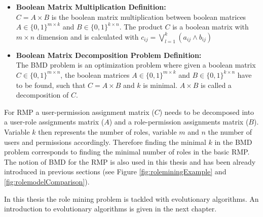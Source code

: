     \begin{itemize}
	    \item \textbf{Boolean Matrix Multiplication Definition:}\\
	    $C = A \times B$ is the boolean matrix multiplication between boolean matrices $A \in \{0,1\}^{m \times k}$ and $B \in \{0,1\}^{k \times n}$. The product $C$ is a boolean matrix with $m \times n$ dimension and is calculated with $c_{ij} = \bigvee_{l=1}^{k}(a_{ij} \wedge b_{ij})$
	     \item \textbf{Boolean Matrix Decomposition Problem Definition:}\\
	    The BMD problem is an optimization problem where given a boolean matrix $C \in \{0,1\}^{m \times n}$, the boolean matrices $A \in \{0,1\}^{m \times k}$ and $B \in \{0,1\}^{k \times n}$ have to be found, such that $C = A \times B$ and $k$ is minimal\cite{vaidya2012boolean}. $A \times B$ is called a decomposition of $C$.
    \end{itemize}
    
    For RMP a user-permission assignment matrix ($C$) needs to be decomposed into a user-role assignments matrix ($A$) and a role-permission assignments matrix ($B$). Variable $k$ then represents the number of roles, variable $m$ and $n$ the number of users and permissions accordingly. Therefore finding the minimal $k$ in the BMD problem corresponds to finding the minimal number of roles in the basic RMP. The notion of BMD for the RMP is also used in this thesis and has been already introduced in previous sections (see Figure \ref{fig:roleminingExample} and \ref{fig:rolemodelComparison}).
   
    
In this thesis the role mining problem is tackled with evolutionary algorithms. An introduction to evolutionary algorithms is given in the next chapter.